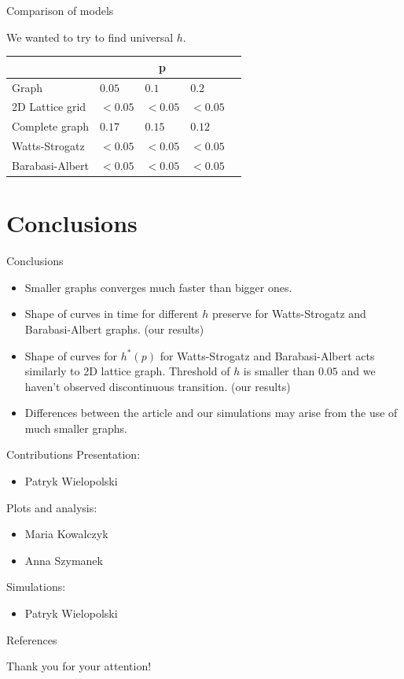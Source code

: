 \documentclass[10pt]{beamer}
\begin{document}
\begin{frame}{Comparison of models}
	
	We wanted to try to find universal $h$.
	\begin{table}[]
		\begin{tabular}{l|llll}
			& \multicolumn{3}{c}{p} &  \\
			\hline
			Graph           & $0.05$   & $0.1$   & $0.2$  &  \\
			\hline
			2D Lattice grid &   $<0.05$     &   $<0.05$    &  $<0.05$    &  \\
			Complete graph  &   $0.17$      &    $0.15$    &  $0.12$     &  \\
			Watts-Strogatz  &   $<0.05$     &   $<0.05$    & $<0.05$     &  \\
			Barabasi-Albert &   $<0.05$     &   $<0.05$    & $<0.05$     & 
		\end{tabular}
	\end{table}
\end{frame}

\section{Conclusions}

\begin{frame}{Conclusions}
	\begin{itemize}
		\item Smaller graphs converges much faster than bigger ones.
		\item Shape of curves in time for different $h$ preserve for Watts-Strogatz and Barabasi-Albert graphs. (our results)
		\item Shape of curves for $h^*(p)$ for Watts-Strogatz and Barabasi-Albert acts similarly to 2D lattice graph. Threshold of $h$ is smaller than $0.05$ and we haven't observed discontinuous transition. (our results)
		\item Differences between the article and our simulations may arise from the use of much smaller graphs.
	\end{itemize}
\end{frame}

\begin{frame}{Contributions}
	Presentation:
	\begin{itemize}
		\item Patryk Wielopolski
	\end{itemize}
	Plots and analysis:
	\begin{itemize}
		\item Maria Kowalczyk
		\item Anna Szymanek
	\end{itemize}
	Simulations:
	\begin{itemize}
		\item Patryk Wielopolski
	\end{itemize}
\end{frame}

\begin{frame}[allowframebreaks]{References}	
	
	
\end{frame}

\begin{frame}
	 \centering
	{\Large Thank you for your attention!}
	
\end{frame}
\end{document}
